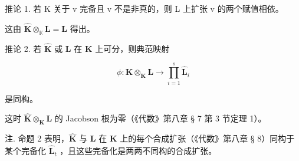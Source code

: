 推论 1. 若 K 关于 v 完备且 v 不是非真的，则 L 上扩张 v 的两个赋值相依。

这由 \(\hat{\mathbf{K}}\otimes_{\mathbb{K}}\mathbf{L} = \mathbf{L}\) 得出。

推论 2. 若 \(\hat{\mathbf{K}}\) 或 \(\mathbf{L}\) 在 \(\mathbf{K}\) 上可分，则典范映射

\[
\phi : \hat {\mathbf {K}} \otimes_ {\mathbf {K}} \mathbf {L} \rightarrow \prod_ {i = 1} ^ {s} \hat {\mathbf {L}} _ {i}
\]

是同构。

这时 \(\hat{\mathbf{K}}\otimes_{\mathbf{K}}\mathbf{L}\) 的 Jacobson 根为零（《代数》第八章 § 7 第 3 节定理 1）。

注. 命题 2 表明，\(\hat{\mathbf{K}}\) 与 \(\mathbf{L}\) 在 \(\mathbf{K}\) 上的每个合成扩张（《代数》第八章 § 8）同构于某个完备化 \(\hat{\mathbf{L}}_t\) ，且这些完备化是两两不同构的合成扩张。
\relax{}
